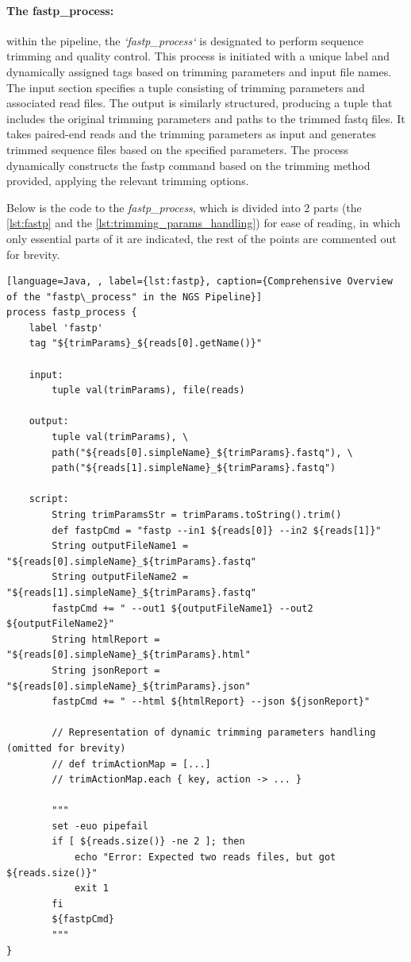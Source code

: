 \paragraph{The fastp\_process:}

within the pipeline, the \textit{`fastp\_process`} is designated to perform sequence \gls{trimming} and quality control. This process is initiated with a unique label and dynamically assigned tags based on \gls{trimming} parameters and input file names. The input section specifies a tuple consisting of \gls{trimming} parameters and associated \gls{read} files. The output is similarly structured, producing a tuple that includes the original \gls{trimming} parameters and paths to the trimmed \gls{fastq} files. It takes \gls{paired-end} \gls{read}s and the \gls{trimming} parameters as input and generates trimmed sequence files based on the specified parameters. The process dynamically constructs the fastp command based on the \gls{trimming} method provided, applying the relevant \gls{trimming} options.

Below is the code to the \textit{fastp\_process}, which is divided into 2 parts (the \autoref{lst:fastp} and the \autoref{lst:trimming_params_handling}) for ease of reading, in which only essential parts of it are indicated, the rest of the points are commented out for brevity.


\begin{lstlisting}[language=Java, , label={lst:fastp}, caption={Comprehensive Overview of the "fastp\_process" in the NGS Pipeline}]
process fastp_process {
    label 'fastp'
    tag "${trimParams}_${reads[0].getName()}"

    input:
        tuple val(trimParams), file(reads)

    output:
        tuple val(trimParams), \
        path("${reads[0].simpleName}_${trimParams}.fastq"), \
        path("${reads[1].simpleName}_${trimParams}.fastq")

    script:
        String trimParamsStr = trimParams.toString().trim()
        def fastpCmd = "fastp --in1 ${reads[0]} --in2 ${reads[1]}"
        String outputFileName1 = "${reads[0].simpleName}_${trimParams}.fastq"
        String outputFileName2 = "${reads[1].simpleName}_${trimParams}.fastq"
        fastpCmd += " --out1 ${outputFileName1} --out2 ${outputFileName2}"
        String htmlReport = "${reads[0].simpleName}_${trimParams}.html"
        String jsonReport = "${reads[0].simpleName}_${trimParams}.json"
        fastpCmd += " --html ${htmlReport} --json ${jsonReport}"

        // Representation of dynamic trimming parameters handling (omitted for brevity)
        // def trimActionMap = [...]
        // trimActionMap.each { key, action -> ... }

        """
        set -euo pipefail
        if [ ${reads.size()} -ne 2 ]; then
            echo "Error: Expected two reads files, but got ${reads.size()}"
            exit 1
        fi
        ${fastpCmd}
        """
}
\end{lstlisting}

